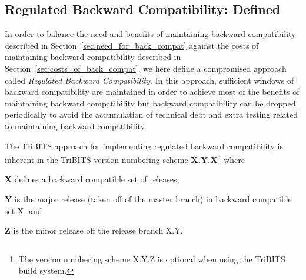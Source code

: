 \documentclass[11pt]{SANDreport}
\begin{document}
%
{}\subsection{Regulated Backward Compatibility: Defined}
\label{sec:defined_reg_back_compat}
%

In order to balance the need and benefits of maintaining backward
compatibility described in Section~\ref{sec:need_for_back_compat}
against the costs of maintaining backward compatibility described in
Section~\ref{sec:costs_of_back_compat}, we here define a compromised
approach called {}\textit{Regulated Backward Compatibility}.  In this
approach, sufficient windows of backward compatibility are maintained
in order to achieve most of the benefits of maintaining backward
compatibility but backward compatibility can be dropped periodically
to avoid the accumulation of technical debt and extra testing related
to maintaining backward compatibility.

The TriBITS approach for implementing regulated backward compatibility
is inherent in the TriBITS version numbering scheme
{}\textbf{X.Y.X}\footnote{The version numbering scheme X.Y.Z is
optional when using the TriBITS build system.} where
%
\begin{compactitem}
%
{}\item\textbf{X} defines a backward compatible set of releases,
%
{}\item\textbf{Y} is the major release (taken off of the master
branch) in backward compatible set X, and
%
{}\item\textbf{Z} is the minor release off the release branch X.Y.
%
\end{compactitem}

\begin{figure}
\begin{center}
\end{center}
\end{figure}
\end{document}

